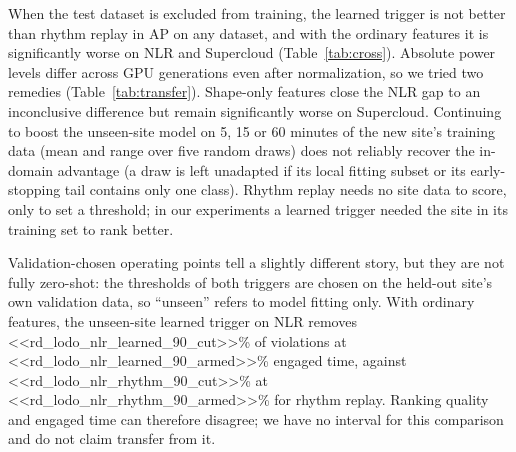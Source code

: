 \documentclass[11pt]{article}
\begin{document}
When the test dataset is excluded from training, the learned trigger is not better than rhythm replay in
AP on any dataset, and with the ordinary features it is significantly worse on NLR and Supercloud
(Table~\ref{tab:cross}). Absolute power levels differ across GPU generations even after normalization, so
we tried two remedies (Table~\ref{tab:transfer}). Shape-only features close the NLR gap to an
inconclusive difference but remain significantly worse on Supercloud. Continuing to boost the unseen-site
model on 5, 15 or 60 minutes of the new site's training data (mean and range over five random draws)
does not reliably recover the in-domain advantage (a draw is left unadapted if its local fitting subset
or its early-stopping tail contains only one class). Rhythm replay needs no site data to score, only to set a
threshold; in our experiments a learned trigger needed the site in its training set to rank better.

Validation-chosen operating points tell a slightly different story, but they are not fully zero-shot:
the thresholds of both triggers are chosen on the held-out site's own validation data, so ``unseen''
refers to model fitting only. With ordinary features, the unseen-site learned trigger on NLR removes <<rd_lodo_nlr_learned_90_cut>>\% of violations at
<<rd_lodo_nlr_learned_90_armed>>\% engaged time, against <<rd_lodo_nlr_rhythm_90_cut>>\% at
<<rd_lodo_nlr_rhythm_90_armed>>\% for rhythm replay. Ranking quality and engaged time can therefore
disagree; we have no interval for this comparison and do not claim transfer from it.
\end{document}
